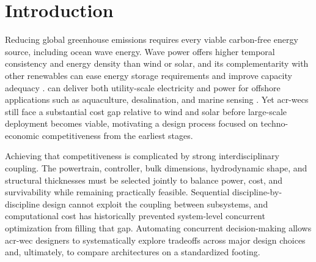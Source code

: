 \section{Introduction}
\label{remdo:sec:intro}



\ifdefined\DISSERTATION
    Reducing global greenhouse emissions requires every viable carbon-free energy source, including ocean wave energy.
    Wave power offers higher temporal consistency and energy density than wind or solar, and its complementarity with other renewables can ease energy storage requirements and improve capacity adequacy \citep{akdemir_opportunities_2023,bhattacharya_timing_2021,pennock_temporal_2022}.
     can deliver both utility-scale electricity and power for offshore applications such as aquaculture, desalination, and marine sensing \citep{livecchi_powering_2019}.
    Yet \glspl{acr-wec} still face a substantial cost gap relative to wind and solar before large-scale deployment becomes viable, motivating a design process focused on techno-economic competitiveness from the earliest stages.

    Achieving that competitiveness is complicated by strong interdisciplinary coupling.
    The powertrain, controller, bulk dimensions, hydrodynamic shape, and structural thicknesses must be selected jointly to balance power, cost, and survivability while remaining practically feasible.
    Sequential discipline-by-discipline design cannot exploit the coupling between subsystems, and computational cost has historically prevented system-level concurrent optimization from filling that gap.
    Automating concurrent decision-making allows \gls{acr-wec} designers to systematically explore tradeoffs across major design choices and, ultimately, to compare architectures on a standardized footing.

